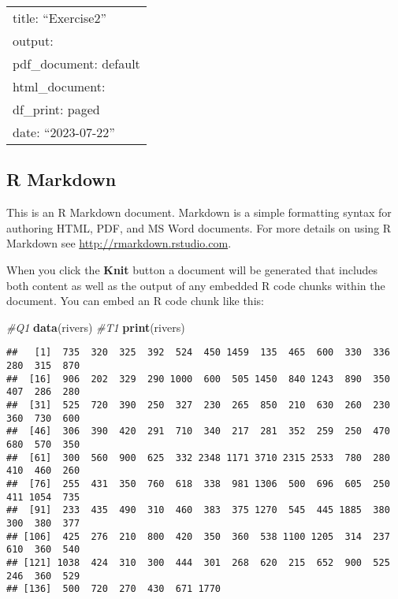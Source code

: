 \documentclass[
]{article}
\author{}
\date{\vspace{-2.5em}}
\newenvironment{Shaded}{\begin{snugshade}}{\end{snugshade}}
\newcommand{\CommentTok}[1]{\textcolor[rgb]{0.56,0.35,0.01}{\textit{#1}}}
\newcommand{\FunctionTok}[1]{\textcolor[rgb]{0.13,0.29,0.53}{\textbf{#1}}}
\newcommand{\NormalTok}[1]{#1}
\begin{document}
\begin{longtable}[]{@{}l@{}}
\toprule\noalign{}
\endhead
\bottomrule\noalign{}
\endlastfoot
title: ``Exercise2'' \\
output: \\
pdf\_document: default \\
html\_document: \\
df\_print: paged \\
date: ``2023-07-22'' \\
\end{longtable}

\hypertarget{r-markdown}{%
\subsection{R Markdown}\label{r-markdown}}

This is an R Markdown document. Markdown is a simple formatting syntax
for authoring HTML, PDF, and MS Word documents. For more details on
using R Markdown see \url{http://rmarkdown.rstudio.com}.

When you click the \textbf{Knit} button a document will be generated
that includes both content as well as the output of any embedded R code
chunks within the document. You can embed an R code chunk like this:

\begin{Shaded}
\begin{Highlighting}[]
\CommentTok{\#Q1}
\FunctionTok{data}\NormalTok{(rivers)}
\CommentTok{\#T1}
\FunctionTok{print}\NormalTok{(rivers)}
\end{Highlighting}
\end{Shaded}

\begin{verbatim}
##   [1]  735  320  325  392  524  450 1459  135  465  600  330  336  280  315  870
##  [16]  906  202  329  290 1000  600  505 1450  840 1243  890  350  407  286  280
##  [31]  525  720  390  250  327  230  265  850  210  630  260  230  360  730  600
##  [46]  306  390  420  291  710  340  217  281  352  259  250  470  680  570  350
##  [61]  300  560  900  625  332 2348 1171 3710 2315 2533  780  280  410  460  260
##  [76]  255  431  350  760  618  338  981 1306  500  696  605  250  411 1054  735
##  [91]  233  435  490  310  460  383  375 1270  545  445 1885  380  300  380  377
## [106]  425  276  210  800  420  350  360  538 1100 1205  314  237  610  360  540
## [121] 1038  424  310  300  444  301  268  620  215  652  900  525  246  360  529
## [136]  500  720  270  430  671 1770
\end{verbatim}
\end{document}
